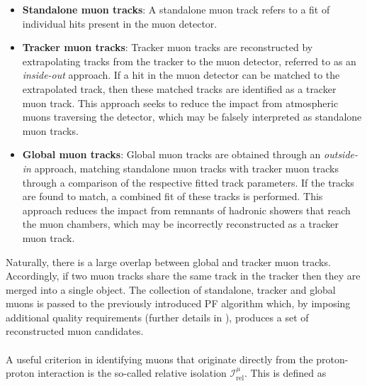 \begin{itemize}
    \item \textbf{Standalone muon tracks}: A standalone muon track refers to a fit of individual hits present in the muon detector.  
    \item \textbf{Tracker muon tracks}: Tracker muon tracks are reconstructed by extrapolating tracks from the tracker to the muon detector, referred to as an \textit{inside-out} approach. If a hit in the muon detector can be matched to the extrapolated track, then these matched tracks are identified as a tracker muon track. This approach seeks to reduce the impact from atmospheric muons traversing the detector, which may be falsely interpreted as standalone muon tracks.
    \item \textbf{Global muon tracks}: Global muon tracks are obtained through an \textit{outside-in} approach, matching standalone muon tracks with tracker muon tracks through a comparison of the respective fitted track parameters. If the tracks are found to match, a combined fit of these tracks is performed. This approach reduces the impact from remnants of hadronic showers that reach the muon chambers, which may be incorrectly reconstructed as a tracker muon track. 
\end{itemize}
Naturally, there is a large overlap between global and tracker muon tracks. Accordingly, if two muon tracks share the same track in the tracker then they are merged into a single object. The collection of standalone, tracker and global muons is passed to the previously introduced PF algorithm which, by imposing additional quality requirements (further details in \cite{ParticleFlowCMS}), produces a set of reconstructed muon candidates. \\
\\
A useful criterion in identifying muons that originate directly from the proton-proton interaction is the so-called relative isolation $ \mathcal{I}^{\mu}_{\mathrm{rel}}$. This is defined as


